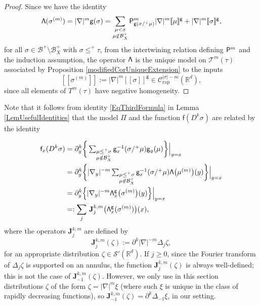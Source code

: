 \documentclass[11pt]{article}
\numberwithin{equation}{section}
\theoremstyle{plain}
\theoremstyle{definition}
\newcommand{\Brac}[1]{[\![#1]\!]}
\newcommand{\rap}{\mathrm{rap}}
\newcommand{\bfJ}{\mathbf{J}}
\newcommand{\sfP}{\mathsf{P}}
\newcommand{\sff}{\mathsf{f}}
\newcommand{\sfg}{\mathsf{g}}
\newcommand{\sfPi}{\mathsf{\Pi}}
\newcommand{\scrT}{\mathscr{T}}
\newcommand{\bbR}{\mathbb{R}}
\newcommand{\mcB}{\mathcal{B}}
\newcommand{\mcC}{\mathcal{C}}
\newcommand\mcS{\mathcal{S}}
\begin{document}
\begin{proof}
Since we have the identity
\[
{\sf\Lambda}(\sigma^{(m)}) = |\nabla|^m\sfg(\sigma) = \sum_{\substack{\mu<\sigma\\\mu\notin\mcB_X^+}}\sfP^m_{\sfg(\sigma/^+\mu)}|\nabla|^m \Brac{\mu}^\sfg + |\nabla|^m\Brac{\sigma}^\sfg,
\]
for all $\sigma\in\mcB^+\setminus\mcB_X^+$ with $\sigma\le^+\tau$, from the intertwining relation defining ${\sf P}^m$ and the induction assumption, the operator $\sf\Lambda$ is the unique model on $\scrT^m(\tau)$ associated by Proposition \ref{modifiedCorUniqueExtension} to the inputs
\[
\Brac{\sigma^{(m)}}:=|\nabla|^m\Brac{\sigma}^\sfg\in \mcC_\rap^{|\sigma|-m}(\bbR^d),
\]
since all elements of $T^m(\tau)$ have negative homogeneity.
\end{proof}

Note that it follows from identity \eqref{EqThirdFormula} in Lemma \ref{LemUsefulIdentities} that the model $\sfPi$ and the function $\sff(D^k\sigma)$ are related by the identity

\begin{equation} \label{formula:f_xD^k}
\begin{split}
\sff_x(D^k\sigma) &= \partial_y^k\bigg\{\textstyle\sum_{\substack{\mu\leq^+\sigma\\\mu\notin\mcB_X^+}}\sfg_x^{-1}(\sigma/^+\mu)\sfg_y(\mu)\bigg\}\Big|_{y=x} \\
&= \partial_y^k\bigg\{|\nabla_y|^{-m} \textstyle\sum_{\substack{\mu\leq^+\sigma\\\mu\notin\mcB_X^+}}\sfg_x^{-1}(\sigma/^+\mu) {\sf\Lambda}\bigl(\mu^{(m)}\bigr)(y)\bigg\}\Big|_{y=x} \\
&= \partial_y^k\Bigl\{|\nabla_y|^{-m} {\sf\Lambda}^{\sfg}_x\bigl(\sigma^{(m)}\bigr)(y)\Bigr\}\Big|_{y=x} \\
&=: \sum_j\, \bfJ_j^{k,m}\bigl({\sf\Lambda}^{\sfg}_x(\sigma^{(m)})\bigr)(x),
\end{split}
\end{equation}
where the operators $\bfJ_j^{k,m}$ are defined by
\[
\bfJ_j^{k,m}(\zeta) := \partial^k|\nabla|^{-m}\Delta_j\zeta,
\]
for an appropriate distribution $\zeta\in\mcS'(\bbR^d)$. If $j\ge0$, since the Fourier transform of $\Delta_j\zeta$ is supported on an annulus, the function $\bfJ_j^{k,m}(\zeta)$ is always well-defined; this is not the case of $\bfJ_{-1}^{k,m}(\zeta)$. However, we only use in this section distributions $\zeta$ of the form $\zeta=|\nabla|^m\xi$ (where such $\xi$ is unique in the class of rapidly decreasing functions), so $\bfJ_{-1}^{k,m}(\zeta)=\partial^k\Delta_{-1}\xi$, in our setting.
\end{document}
